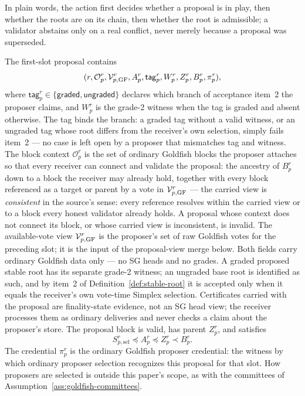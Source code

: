 \begin{definition}
In plain words, the action first decides whether a proposal is in play,
then whether the roots are on its chain, then whether the root is
admissible; a validator abstains only on a real conflict, never merely
because a proposal was superseded.
\end{definition}


\begin{definition}\label{def:recovery-proposal}
The first-slot proposal contains
\[
 (r,\mathcal O_p^r,\mathcal V_{p,\rm GF}^r,
   A_p^r,\mathsf{tag}_p^r,W_p^r,Z_p^r,B_p^r,\pi_p^r),
\]
where \(\mathsf{tag}_p^r\in\{\textsf{graded},\textsf{ungraded}\}\)
declares which branch of acceptance item~2 the proposer claims, and
\(W_p^r\) is the grade-2 witness when the tag is \textsf{graded} and
absent otherwise.  The tag binds the branch: a \textsf{graded} tag
without a valid witness, or an \textsf{ungraded} tag whose root differs
from the receiver's own selection, simply fails item~2 --- no case is
left open by a proposer that mismatches tag and witness.
The block context \(\mathcal O_p^r\) is the set of ordinary Goldfish
blocks the proposer attaches so that every receiver can connect and
validate the proposal: the ancestry of \(B_p^r\) down to a block the
receiver may already hold, together with every block referenced as a
target or parent by a vote in \(\mathcal V_{p,\rm GF}^r\) --- the
carried view is \emph{consistent} in the source's sense: every
reference resolves within the carried view or to a block every honest
validator already holds.  A proposal whose context does not connect its
block, or whose carried view is inconsistent, is invalid.  The available-vote view \(\mathcal V_{p,\rm GF}^r\) is
the proposer's set of raw Goldfish votes for the preceding slot; it is
the input of the proposal-view merge below.  Both fields carry ordinary
Goldfish data only --- no SG heads and no grades.  A graded proposed stable root has its separate grade-2 witness; an
ungraded base root is identified as such, and by item~2 of
Definition~\ref{def:stable-root} it is accepted only when it equals the
receiver's own vote-time Simplex selection.  Certificates carried with
the proposal are finality-state evidence, not an SG head view; the
receiver processes them as ordinary deliveries and never checks a claim
about the proposer's store.  The proposal block is valid, has parent \(Z_p^r\), and satisfies
\[
 S_{p,\mathrm{sel}}^r\preceq A_p^r\preceq Z_p^r\prec B_p^r.
\]
The credential \(\pi_p^r\) is the ordinary Goldfish proposer credential: the
witness by which ordinary proposer selection recognizes this proposal for that
slot.  How proposers are selected is outside this paper's scope, as with the
committees of Assumption~\ref{ass:goldfish-committees}.


\end{definition}

